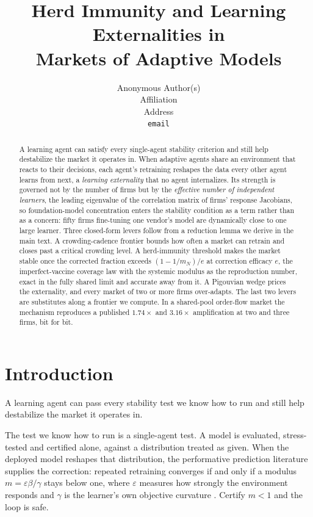 \documentclass{article}
\title{Herd Immunity and Learning Externalities in\\ Markets of Adaptive Models}
\author{%
  Anonymous Author(s) \\
  Affiliation \\
  Address \\
  \texttt{email} \\
}
\theoremstyle{plain}
\theoremstyle{definition}
\newcommand{\mN}{m_N}
\begin{document}
\maketitle

\begin{abstract}
A learning agent can satisfy every single-agent stability criterion and still help destabilize the market it operates in. When adaptive agents share an environment that reacts to their decisions, each agent's retraining reshapes the data every other agent learns from next, a \emph{learning externality} that no agent internalizes. Its strength is governed not by the number of firms but by the \emph{effective number of independent learners}, the leading eigenvalue of the correlation matrix of firms' response Jacobians, so foundation-model concentration enters the stability condition as a term rather than as a concern: fifty firms fine-tuning one vendor's model are dynamically close to one large learner. Three closed-form levers follow from a reduction lemma we derive in the main text. A crowding-cadence frontier bounds how often a market can retrain and closes past a critical crowding level. A herd-immunity threshold makes the market stable once the corrected fraction exceeds $(1-1/\mN)/e$ at correction efficacy $e$, the imperfect-vaccine coverage law with the systemic modulus as the reproduction number, exact in the fully shared limit and accurate away from it. A Pigouvian wedge prices the externality, and every market of two or more firms over-adapts. The last two levers are substitutes along a frontier we compute. In a shared-pool order-flow market the mechanism reproduces a published $1.74\times$ and $3.16\times$ amplification at two and three firms, bit for bit.
\end{abstract}

\section{Introduction}

A learning agent can pass every stability test we know how to run and still help destabilize the market it operates in.

The test we know how to run is a single-agent test. A model is evaluated, stress-tested and certified alone, against a distribution treated as given. When the deployed model reshapes that distribution, the performative prediction literature supplies the correction: repeated retraining converges if and only if a modulus $m = \varepsilon\beta/\gamma$ stays below one, where $\varepsilon$ measures how strongly the environment responds and $\gamma$ is the learner's own objective curvature \citep{perdomo2020}. Certify $m<1$ and the loop is safe.
\end{document}
